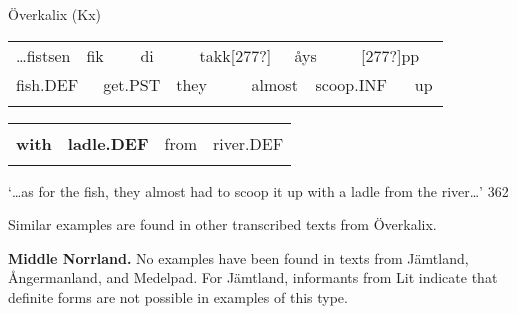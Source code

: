 \begin{listWWNumileveli}
\item 

\begin{styleExample}
Överkalix (Kx)

\end{styleExample}

\end{listWWNumileveli}

\begin{tabular}{llllllllllll}
\lsptoprule
…fistsen & \multicolumn{2}{l}{fik

} & \multicolumn{2}{l}{di

} & \multicolumn{2}{l}{takk[277?]

} & \multicolumn{2}{l}{åys

} & \multicolumn{2}{l}{[277?]pp

} & \\
\multicolumn{2}{l}{fish.DEF

} & \multicolumn{2}{l}{get.PST

} & \multicolumn{2}{l}{they

} & \multicolumn{2}{l}{almost

} & \multicolumn{2}{l}{scoop.INF

} & \multicolumn{2}{l}{up

}\\
\lspbottomrule
\end{tabular}

\begin{tabular}{llll}
\lsptoprule
\multicolumn{4}{l}{{\bfseries ve}

}\\
{\bfseries with} & {\bfseries ladle.DEF} & from & river.DEF\\
\lspbottomrule
\end{tabular}

\begin{styleTranslation}
‘…as for the fish, they almost had to scoop it up with a ladle from the river…’ 362

\end{styleTranslation}

\begin{styleBodyTextFirst}
Similar examples are found in other transcribed texts from Överkalix. 

\end{styleBodyTextFirst}

\begin{styleBodytextC}
\textbf{Middle Norrland.} No examples have been found in texts from Jämtland, Ångermanland, and Medelpad. For Jämtland, informants from Lit indicate that definite forms are not possible in examples of this type.

\end{styleBodytextC}

